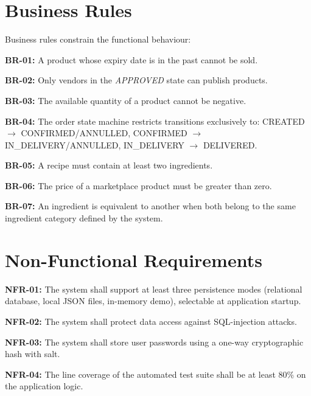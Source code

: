 \section{Business Rules}

Business rules constrain the functional behaviour:

\begin{reqs}
    \item \textbf{BR-01:} A product whose expiry date is in the past cannot be
    sold.
    \item \textbf{BR-02:} Only vendors in the \emph{APPROVED} state can
    publish products.
    \item \textbf{BR-03:} The available quantity of a product cannot be
    negative.
    \item \textbf{BR-04:} The order state machine restricts transitions
    exclusively to: CREATED $\rightarrow$ CONFIRMED/ANNULLED, CONFIRMED $
    \rightarrow$ IN\_DELIVERY/ANNULLED, IN\_DELIVERY $\rightarrow$ DELIVERED.
    \item \textbf{BR-05:} A recipe must contain at least two ingredients.
    \item \textbf{BR-06:} The price of a marketplace product must be greater
    than zero.
    \item \textbf{BR-07:} An ingredient is equivalent to another when both
    belong to the same ingredient category defined by the system.
\end{reqs}

\section{Non-Functional Requirements}

\begin{reqs}
    \item \textbf{NFR-01:} The system shall support at least three persistence
    modes (relational database, local JSON files, in-memory demo), selectable
    at application startup.
    \item \textbf{NFR-02:} The system shall protect data access against
    SQL-injection attacks.
    \item \textbf{NFR-03:} The system shall store user passwords using a
    one-way cryptographic hash with salt.
    \item \textbf{NFR-04:} The line coverage of the automated test suite shall
    be at least 80\% on the application logic.
\end{reqs}

